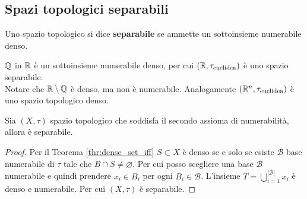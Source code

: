 \subsection{\textcolor{TopGener}{\textbf{Spazi topologici separabili}}}



\begin{definition}
	Uno spazio topologico si dice \textbf{separabile} se ammette un sottoinsieme numerabile denso.
\end{definition}

\begin{example}
	$\mathbb{Q}$ in $\mathbb{R}$ è un sottoinsieme numerabile denso, per cui $(\mathbb{R}, \tau_{\text{euclidea}})$ è uno spazio separabile. \\ Notare che $\mathbb{R} \setminus \mathbb{Q}$ è denso, ma non è numerabile. Analogamente $(\mathbb{R}^n, \tau_{\text{euclidea}})$ è uno spazio topologico denso.
\end{example}

\begin{theorem}
	Sia $(X, \tau)$ spazio topologico che soddisfa il secondo assioma di numerabilità, allora è separabile.	
\end{theorem}
\begin{proof}
	Per il Teorema \ref{thr:dense_set_iff} $S \subset X$ è denso se e solo se esiste $\mathcal{B}$ base numerabile di $\tau$ tale che $B \cap S \neq \varnothing$. Per cui posso scegliere una base $\mathcal{B}$ numerabile e quindi prendere $x_i \in B_i$ per ogni $B_i \in \mathcal{B}$. L'insieme $T = \bigcup^{|\mathcal{B}|}_{i=1} x_i$ è denso e numerabile. Per cui $(X, \tau)$ è separabile.
\end{proof}

